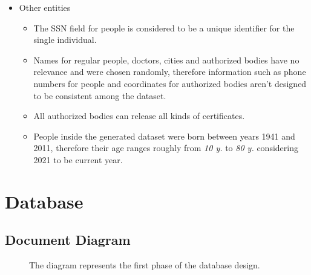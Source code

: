 \documentclass[12pt, a4paper]{article}
\begin{document}
\begin{itemize}
    \item Other entities
    \begin{itemize}
        \item[] The SSN field for people is considered to be a unique
            identifier for the single individual.
        \item[] Names for regular people, doctors, cities and authorized bodies 
            have no relevance and were chosen randomly, therefore information 
            such as phone numbers for people and coordinates for authorized 
            bodies aren't designed to be consistent among the dataset.
        \item[] All authorized bodies can release all kinds of certificates.
        \item[] People inside the generated dataset were born between years 1941 and
            2011, therefore their age ranges roughly from \emph{10 y.} to 
            \emph{80 y.} considering 2021 to be current year.
    \end{itemize}

\end{itemize}
  
\clearpage

\section{Database}

\subsection{Document Diagram}
\begin{figure}[ht]
    \caption*{The diagram represents the first phase of the database design.} %
\end{figure}
\end{document}
